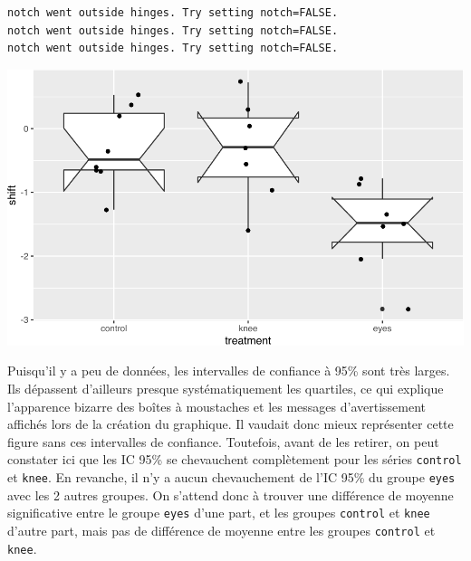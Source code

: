 \documentclass[
  a4paper,
]{article}
\newenvironment{Shaded}{\begin{snugshade}}{\end{snugshade}}
\newcommand{\DataTypeTok}[1]{\textcolor[rgb]{0.00,0.34,0.68}{#1}}
\newcommand{\FloatTok}[1]{\textcolor[rgb]{0.69,0.50,0.00}{#1}}
\newcommand{\KeywordTok}[1]{\textcolor[rgb]{0.12,0.11,0.11}{\textbf{#1}}}
\newcommand{\NormalTok}[1]{\textcolor[rgb]{0.12,0.11,0.11}{#1}}
\newcommand{\OperatorTok}[1]{\textcolor[rgb]{0.12,0.11,0.11}{#1}}
\newcommand{\StringTok}[1]{\textcolor[rgb]{0.75,0.01,0.01}{#1}}
\begin{document}
\begin{verbatim}
notch went outside hinges. Try setting notch=FALSE.
notch went outside hinges. Try setting notch=FALSE.
notch went outside hinges. Try setting notch=FALSE.
\end{verbatim}

\begin{center}\includegraphics[width=0.9\linewidth]{figure/unnamed-chunk-76-1} \end{center}

Puisqu'il y a peu de données, les intervalles de confiance à 95\% sont très larges. Ils dépassent d'ailleurs presque systématiquement les quartiles, ce qui explique l'apparence bizarre des boîtes à moustaches et les messages d'avertissement affichés lors de la création du graphique. Il vaudait donc mieux représenter cette figure sans ces intervalles de confiance. Toutefois, avant de les retirer, on peut constater ici que les IC 95\% se chevauchent complètement pour les séries \texttt{control} et \texttt{knee}. En revanche, il n'y a aucun chevauchement de l'IC 95\% du groupe \texttt{eyes} avec les 2 autres groupes. On s'attend donc à trouver une différence de moyenne significative entre le groupe \texttt{eyes} d'une part, et les groupes \texttt{control} et \texttt{knee} d'autre part, mais pas de différence de moyenne entre les groupes \texttt{control} et \texttt{knee}.

\begin{Shaded}
\end{Shaded}
\end{document}
